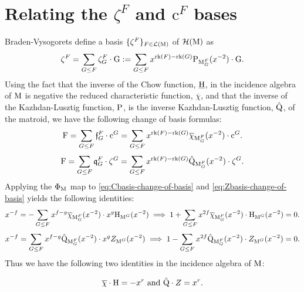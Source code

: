 \documentclass[11pt]{article}
\newcommand{\calH}{\mathcal{H}}
\newcommand{\chow}{\normalfont\text{\underline{H}}}
\newcommand{\augchow}{\normalfont\text{H}}
\newcommand{\klpoly}{\normalfont\text{P}}
\newcommand{\invklpoly}{\normalfont\hat{\text{Q}}}
\newcommand{\redchar}{\overline{\chi}}
\newcommand{\rank}{\normalfont\text{rk}}
\newcommand{\M}{\normalfont\text{M}}
\newcommand{\Ebasis}[1]{\mathrm{#1}}
\newcommand{\Cbasis}[1]{\mathrm{c}^{#1}}
\newcommand{\Zbasis}[1]{\zeta^{#1}}
\newcommand{\ZbasisSub}[2]{\zeta^{#1}_{#2}}
\theoremstyle{remark}
\begin{document}
\section{Relating the \(\Zbasis{F}\) and \(\Cbasis{F}\) bases}
Braden-Vysogorets define a basis \(\{\Zbasis{F}\}_{F \in \mathcal{L}(\M)}\) of \(\calH(\M)\) as
\begin{equation} \label{eq:Zbasis-definition}
    \Zbasis{F} = \sum_{G \le F}\ZbasisSub{F}{G} \cdot \Ebasis{G} :=
    \sum_{G \le F} x^{\rank(F)-\rank(G)} \klpoly_{\M_G^F}(x^{-2}) \cdot \Ebasis{G}.
\end{equation}
Using the fact that the inverse of the Chow function, \(\chow\), in the incidence algebra
of \(\M\) is negative the reduced characteristic function, \(\redchar\), and that the inverse of the
Kazhdan-Lusztig function, \(\klpoly\),
is the inverse Kazhdan-Lusztig function, \(\invklpoly\), of the matroid, we have the following
change of basis formulas:
\begin{equation} \label{eq:Cbasis-change-of-basis}
    \Ebasis{F} =\sum_{G \le F} \mathfrak{f}^F_G \cdot \Cbasis{G} =
    \sum_{G \le F} x^{\rank(F)-\rank(G)}\redchar_{\M_G^F}(x^{-2}) \cdot \Cbasis{G}.
\end{equation}
\begin{equation} \label{eq:Zbasis-change-of-basis}
    \Ebasis{F} = \sum_{G \le F} \mathfrak{q}^F_G \cdot \Zbasis{G} =
    \sum_{G \le F} x^{\rank(F)-\rank(G)}\invklpoly_{\M_G^F}(x^{-2}) \cdot \Zbasis{G}.
\end{equation}
Applying the \(\Phi_{\M}\) map to \eqref{eq:Cbasis-change-of-basis} and \eqref{eq:Zbasis-change-of-basis} yields the following identities:
\begin{equation} \label{eq:Cbasis-change-of-basis-Phi}
    x^{-f} = -\sum_{G \le F} x^{f-g}\redchar_{\M_G^F}(x^{-2}) \cdot x^g\augchow_{\M^G}(x^{-2})
    \implies 1 + \sum_{G \le F} x^{2f}\redchar_{\M_G^F}(x^{-2}) \cdot \augchow_{\M^G}(x^{-2}) = 0.
\end{equation}
\begin{equation} \label{eq:Zbasis-change-of-basis-Phi}
    x^{-f} = \sum_{G \le F} x^{f-g}\invklpoly_{\M_G^F}(x^{-2}) \cdot x^g Z_{\M^G}(x^{-2})
    \implies 1 - \sum_{G \le F} x^{2f}\invklpoly_{\M_G^F}(x^{-2}) \cdot Z_{\M^G}(x^{-2}) = 0.
\end{equation}
Thus we have the following two identities in the incidence algebra of \(\M\):
\begin{tcolorbox}
    \begin{equation} \label{eq:chichow-and-QZ}
        \redchar\cdot \augchow = -x^r \text{ and }
        \invklpoly \cdot Z = x^r.
    \end{equation}
\end{tcolorbox}
\end{document}
